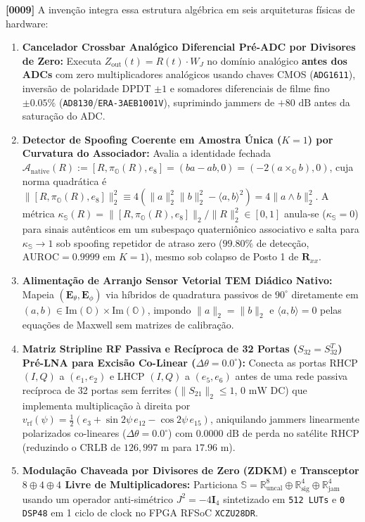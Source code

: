 \documentclass[12pt,a4paper]{article}
\begin{document}
\textbf{[0009]} A inven\c{c}\~ao integra essa estrutura alg\'ebrica em seis arquiteturas f\'isicas de hardware:
\begin{enumerate}[leftmargin=18pt,itemsep=2pt]
    \item \textbf{Cancelador Crossbar Anal\'ogico Diferencial Pr\'e-ADC por Divisores de Zero:} Executa $Z_{\mathrm{out}}(t) = R(t) \cdot W_J$ no dom\'inio anal\'ogico \textbf{antes dos ADCs} com zero multiplicadores anal\'ogicos usando chaves CMOS (\texttt{ADG1611}), invers\~ao de polaridade DPDT $\pm 1$ e somadores diferenciais de filme fino $\pm 0.05\%$ (\texttt{AD8130}/\texttt{ERA-3AEB1001V}), suprimindo jammers de $+80\text{ dB}$ antes da satura\c{c}\~ao do ADC.
    \item \textbf{Detector de Spoofing Coerente em Amostra \'Unica ($K=1$) por Curvatura do Associador:} Avalia a identidade fechada $\mathcal{A}_{\mathrm{native}}(R) := [R, \pi_{\mathbb{O}}(R), e_8] = (ba - ab, 0) = (-2(a \times_{\mathbb{O}} b), 0)$, cuja norma quadr\'atica \'e $\|[R, \pi_{\mathbb{O}}(R), e_8]\|_2^2 \equiv 4(\|a\|_2^2 \|b\|_2^2 - \langle a, b \rangle^2) = 4\|a \wedge b\|_2^2$. A m\'etrica $\kappa_{\mathbb{S}}(R) = \|[R,\pi_{\mathbb{O}}(R),e_8]\|_2 / \|R\|_2^2 \in [0, 1]$ anula-se ($\kappa_{\mathbb{S}}=0$) para sinais aut\^enticos em um subespa\c{c}o quaterni\^onico associativo e salta para $\kappa_{\mathbb{S}} \to 1$ sob spoofing repetidor de atraso zero ($99.80\%$ de detec\c{c}\~ao, $\mathrm{AUROC} = 0.9999$ em $K=1$), mesmo sob colapso de Posto 1 de $\hat{\mathbf{R}}_{xx}$.
    \item \textbf{Alimenta\c{c}\~ao de Arranjo Sensor Vetorial TEM Di\'adico Nativo:} Mapeia $(\mathbf{E}_\theta, \mathbf{E}_\phi)$ via h\'ibridos de quadratura passivos de $90^\circ$ diretamente em $(a, b) \in \mathrm{Im}(\mathbb{O}) \times \mathrm{Im}(\mathbb{O})$, impondo $\|a\|_2 = \|b\|_2$ e $\langle a, b \rangle = 0$ pelas equa\c{c}\~oes de Maxwell sem matrizes de calibra\c{c}\~ao.
    \item \textbf{Matriz Stripline RF Passiva e Rec\'iproca de 32 Portas ($S_{32} = S_{32}^T$) Pr\'e-LNA para Excis\~ao Co-Linear ($\Delta\theta = 0.0^\circ$):} Conecta as portas RHCP $(I,Q)$ a $(e_1,e_2)$ e LHCP $(I,Q)$ a $(e_5,e_6)$ antes de uma rede passiva rec\'iproca de 32 portas sem ferrites ($\|S_{21}\|_2 \le 1$, $0\text{ mW}$ DC) que implementa multiplica\c{c}\~ao \`a direita por $v_{\mathrm{rf}}(\psi) = \frac{1}{2}(e_3 + \sin 2\psi\,e_{12} - \cos 2\psi\,e_{15})$, aniquilando jammers linearmente polarizados co-lineares ($\Delta\theta = 0.0^\circ$) com $0.0000\text{ dB}$ de perda no sat\'elite RHCP (reduzindo o CRLB de $126{,}997\text{ m}$ para $17.96\text{ m}$).
    \item \textbf{Modula\c{c}\~ao Chaveada por Divisores de Zero (ZDKM) e Transceptor $8\oplus 4\oplus 4$ Livre de Multiplicadores:} Particiona $\mathbb{S} = \mathbb{R}^8_{\mathrm{uncal}} \oplus \mathbb{R}^4_{\mathrm{sig}} \oplus \mathbb{R}^4_{\mathrm{jam}}$ usando um operador anti-sim\'etrico $J^2 = -4\mathbf{I}_4$ sintetizado em \texttt{512 LUTs} e \texttt{0 DSP48} em 1 ciclo de clock no FPGA RFSoC \texttt{XCZU28DR}.
\end{enumerate}
\end{document}
